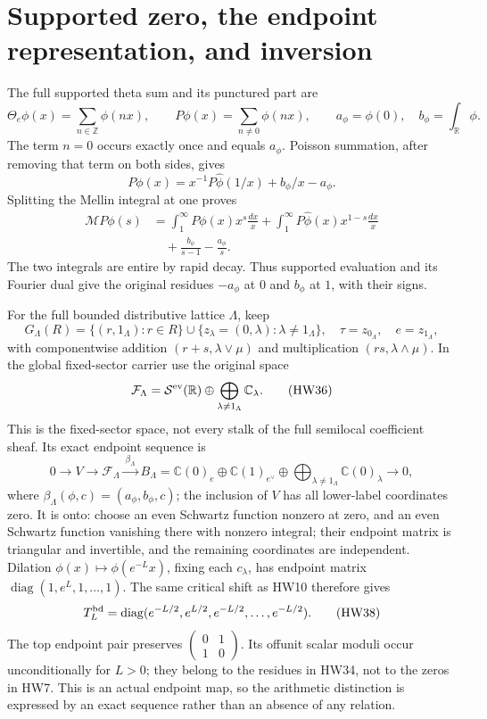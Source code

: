 \documentclass[11pt]{article}
\newcommand{\C}{\mathbb C}
\newcommand{\R}{\mathbb R}
\newcommand{\Z}{\mathbb Z}
\newcommand{\M}{\mathcal M}
\begin{document}
\section{Supported zero, the endpoint representation, and inversion}

The full supported theta sum and its punctured part are
\[
 \Theta_e\phi(x)=\sum_{n\in\Z}\phi(nx),\qquad
 P\phi(x)=\sum_{n\ne0}\phi(nx),\qquad
 a_\phi=\phi(0),\quad b_\phi=\int_\R\phi.
 \tag{HW32}
\]
The term \(n=0\) occurs exactly once and equals \(a_\phi\).
Poisson summation, after removing that term on both sides, gives
\[
 P\phi(x)=x^{-1}P\widehat\phi(1/x)+b_\phi/x-a_\phi .
 \tag{HW33}
\]
Splitting the Mellin integral at one proves
\[
 \begin{split}
 \M P\phi(s)
  &=\int_1^\infty P\phi(x)x^s\frac{dx}{x}
    +\int_1^\infty P\widehat\phi(x)x^{1-s}\frac{dx}{x}\\
  &\quad+\frac{b_\phi}{s-1}-\frac{a_\phi}{s}.
 \end{split}
 \tag{HW34}
\]
The two integrals are entire by rapid decay. Thus supported
evaluation and its Fourier dual give the original residues
\(-a_\phi\) at \(0\) and \(b_\phi\) at \(1\), with their signs.

For the full bounded distributive lattice \(\Lambda\), keep
\[
 G_\Lambda(R)=\{(r,1_\Lambda):r\in R\}
       \cup\{z_\lambda=(0,\lambda):\lambda\ne1_\Lambda\},
 \quad \tau=z_{0_\Lambda},\quad e=z_{1_\Lambda},
 \tag{HW35}
\]
with componentwise addition \((r+s,\lambda\vee\mu)\) and
multiplication \((rs,\lambda\wedge\mu)\).
In the global fixed-sector carrier use the original space
\[
 \mathcal F_\Lambda=\mathcal S^{\rm ev}(\R)
          \oplus\bigoplus_{\lambda\ne1_\Lambda}\C_\lambda .
 \tag{HW36}
\]
This is the fixed-sector space, not every stalk of the full
semilocal coefficient sheaf. Its exact endpoint sequence is
\[
 0\longrightarrow V\longrightarrow\mathcal F_\Lambda
 \xrightarrow{\ \beta_\Lambda\ }
 B_\Lambda
 =\C(0)_e\oplus\C(1)_{e^\vee}
                  \oplus\bigoplus_{\lambda\ne1_\Lambda}\C(0)_\lambda
 \longrightarrow0,
 \tag{HW37}\label{hw:endpointseq}
\]
where \(\beta_\Lambda(\phi,c)=(a_\phi,b_\phi,c)\);
the inclusion of \(V\) has all lower-label coordinates zero.
It is onto: choose an even Schwartz function nonzero at zero,
and an even Schwartz function vanishing there with nonzero
integral; their endpoint matrix is triangular and invertible,
and the remaining coordinates are independent.
Dilation \(\phi(x)\mapsto\phi(e^{-L}x)\), fixing each \(c_\lambda\),
has endpoint matrix
\(\operatorname{diag}(1,e^L,1,\ldots,1)\).
The same critical shift as HW10 therefore gives
\[
 T_L^{\rm bd}
   =\operatorname{diag}(e^{-L/2},e^{L/2},
                                e^{-L/2},\ldots,e^{-L/2}).
 \tag{HW38}
\]
The top endpoint pair preserves
\(\left(\begin{smallmatrix}0&1\\1&0\end{smallmatrix}\right)\).
Its offunit scalar moduli occur unconditionally for \(L>0\);
they belong to the residues in HW34, not to the zeros in HW7.
This is an actual endpoint map, so the arithmetic distinction
is expressed by an exact sequence rather than an absence of
any relation.
\end{document}
